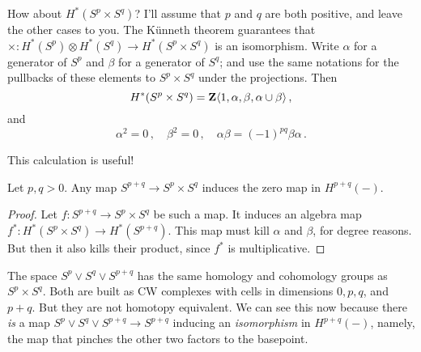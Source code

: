 \begin{example}
How about $H^\ast(S^p\times S^q)$? I'll assume that $p$ and $q$ are both
positive, and leave the other cases to you. The K\"unneth theorem guarantees
that $\times:H^*(S^p)\otimes H^*(S^q)\to H^*(S^p\times S^q)$ is an isomorphism.
Write $\alpha$ for a generator of $S^p$ and $\beta$ for a generator of 
$S^q$; and use the same notations for the pullbacks of these elements to
$S^p\times S^q$ under the projections. Then 
\[
H^*(S^p\times S^q)=\mathbf Z\langle1,\alpha,\beta,\alpha\cup\beta\rangle\,,
\]
and
\[
\alpha^2=0\,,\quad\beta^2=0\,,\quad\alpha\beta=(-1)^{pq}\beta\alpha\,.
\]

This calculation is useful!
\begin{corollary} Let $p,q>0$.
Any map $S^{p+q}\to S^p\times S^q$ induces the zero map in $H^{p+q}(-)$. 
\end{corollary}
\begin{proof}
Let $f:S^{p+q}\to S^p\times S^q$ be such a map. It induces an algebra map
$f^*:H^*(S^p\times S^q)\to H^*(S^{p+q})$. This map must kill $\alpha$ and
$\beta$, for degree reasons. But then it also kills their product, since
$f^*$ is multiplicative. 
\end{proof}
The space $S^p\vee S^q\vee S^{p+q}$ has the same homology and 
cohomology groups as
$S^p\times S^q$. Both are built as CW complexes with cells in dimensions
$0, p, q$, and $p+q$. But they are not homotopy equivalent. We can see this
now because there {\em is} a map $S^p\vee S^q\vee S^{p+q}\to S^{p+q}$
inducing an {\em isomorphism} in $H^{p+q}(-)$, namely, the map that pinches
the other two factors to the basepoint. 
\end{example}
